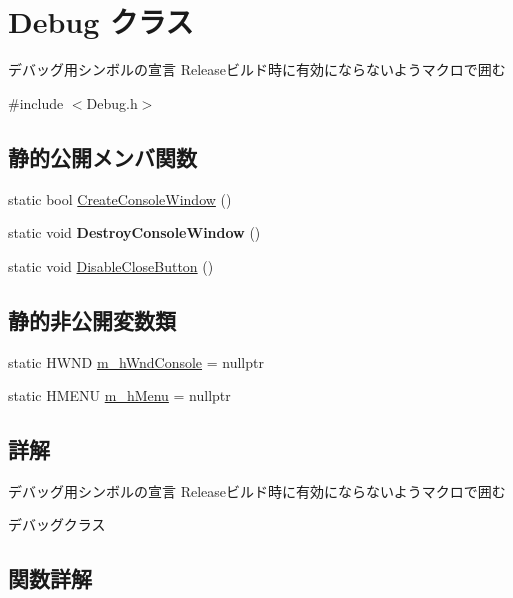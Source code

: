 \hypertarget{class_debug}{}\section{Debug クラス}
\label{class_debug}


デバッグ用シンボルの宣言  Releaseビルド時に有効にならないようマクロで囲む  




{\ttfamily \#include $<$Debug.\+h$>$}

\subsection*{静的公開メンバ関数}
\begin{DoxyCompactItemize}
\item 
static bool \hyperlink{class_debug_a9010a273f655a34e0383917d2108a204}{Create\+Console\+Window} ()
\item 
static void {\bfseries Destroy\+Console\+Window} ()\hypertarget{class_debug_a8e316a9c6e380131ee036b41ab080bac}{}\label{class_debug_a8e316a9c6e380131ee036b41ab080bac}

\item 
static void \hyperlink{class_debug_ae62056266b5e3ea2c0532a7740ad3368}{Disable\+Close\+Button} ()
\end{DoxyCompactItemize}
\subsection*{静的非公開変数類}
\begin{DoxyCompactItemize}
\item 
static H\+W\+ND \hyperlink{class_debug_aac93c9dce14754b224b4f30c58301a41}{m\+\_\+h\+Wnd\+Console} = nullptr
\item 
static H\+M\+E\+NU \hyperlink{class_debug_afd3dd5f72cf90cc16b3aebc01e53bcf3}{m\+\_\+h\+Menu} = nullptr
\end{DoxyCompactItemize}


\subsection{詳解}
デバッグ用シンボルの宣言  Releaseビルド時に有効にならないようマクロで囲む 

デバッグクラス 

\subsection{関数詳解}
